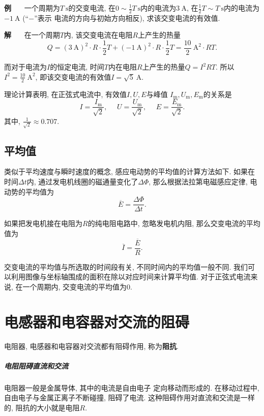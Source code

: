 \documentclass[11pt,a4paper]{ctexbook}
\newcounter{exam}[chapter]
\newcommand{\bre}{\ \ \ }
\newcommand{\examlabel}{\textbf{例\theexam}}
\newcommand{\soln}{\textbf{解}\bre}
\newcommand{\unit}[1]{\ \mathrm{#1}}
\newenvironment{example}{\bigskip\par\refstepcounter{exam}\examlabel\bre}{\par}
\newenvironment{solution}{\par\soln}{\par\bigskip}
\begin{document}
\begin{example}
    一个周期为$T\unit{s}$的交变电流, 在$0\sim \displaystyle\frac12T\unit{s}$内的电流为$3\unit{A}$,
    在$\displaystyle\frac12T\sim T\unit{s}$内的电流为$-1\unit{A}$ (``$-$''表示
    电流的方向与初始方向相反), 求该交变电流的有效值.
\end{example}
\begin{solution}
    在一个周期$T$内, 该交变电流在电阻$R$上产生的热量
    $$Q = (3\unit{A})^2\cdot R\cdot\frac12T + (-1\unit{A})^2\cdot R\cdot\frac12T = \frac{10}{2}\unit{A^2}\cdot RT.$$

    而对于电流为$I$的恒定电流, 时间$T$内在电阻$R$上产生的热量$Q = I^2RT.$
    所以$I^2 = \displaystyle\frac{10}{2}\unit{A^2}$, 即该交变电流的有效值$I = \sqrt{5}\unit{A}$.
\end{solution}


理论计算表明, 在正弦式电流中, 有效值$I, U, E$与峰值
$I_\mathrm{m}, U_\mathrm{m}, E_\mathrm{m}$的关系是
$$I = \frac{I_\mathrm{m}}{\sqrt{2}}, \bre\bre
U = \frac{U_\mathrm{m}}{\sqrt{2}}, \bre\bre
E = \frac{E_\mathrm{m}}{\sqrt{2}}. $$
其中, $\displaystyle\frac{1}{\sqrt{2}}\approx 0.707.$

\subsection{平均值}
类似于平均速度与瞬时速度的概念, 感应电动势的平均值的计算方法如下.
如果在时间$\Delta t$内, 通过发电机线圈的磁通量变化了$\Delta\Phi$,
那么根据法拉第电磁感应定律, 电动势的平均值为
$$\overline{E} = \frac{\Delta\Phi}{\Delta t}.$$

如果把发电机接在电阻为$R$的纯电阻电路中, 忽略发电机内阻,
那么交变电流的平均值为
$$\overline{I} = \frac{\overline{E}}{R}.$$

交变电流的平均值与所选取的时间段有关, 不同时间内的平均值一般不同.
我们可以利用图像与坐标轴围成的面积在除以对应时间来计算平均值.
对于正弦式电流来说, 在一个周期内, 交变电流的平均值为0.

\section{电感器和电容器对交流的阻碍}

电阻器, 电感器和电容器对交流都有阻碍作用, 称为\textbf{阻抗}.

\subparagraph{电阻阻碍直流和交流} 电阻器一般是金属导体, 其中的电流是自由电子
定向移动而形成的. 在移动过程中, 自由电子与金属正离子不断碰撞, 阻碍了电流.
这种阻碍作用对直流和交流是一样的, 阻抗的大小就是电阻$R$.
\end{document}
